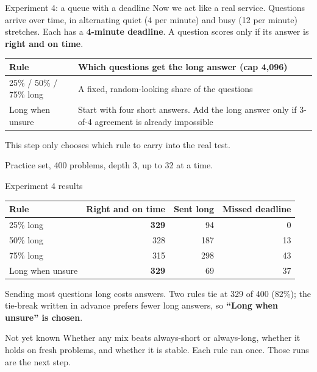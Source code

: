 \documentclass[aspectratio=169,11pt]{beamer}
\newcommand{\src}[1]{\par\vfill\begin{minipage}{0.96\textwidth}\color{muted}\tiny #1\end{minipage}\vspace{-0.15em}}
\newcommand{\takeaway}[1]{\par\vfill\begin{center}\colorbox{accent!8}{\parbox{0.9\textwidth}{\centering\small #1}}\end{center}\vspace{0.2em}}
\begin{document}
\begin{frame}{Experiment 4: a queue with a deadline}
  \small
  Now we act like a real service. Questions arrive over time, in alternating quiet (4 per minute)
  and busy (12 per minute) stretches. Each has a \textbf{4-minute deadline}.
  A question scores only if its answer is \textbf{right and on time}.
  \vspace{0.5em}
  \begin{center}
  \renewcommand{\arraystretch}{1.2}
  \begin{tabular}{@{}l p{8.4cm}@{}}
    \toprule
    \textbf{Rule} & \textbf{Which questions get the long answer (cap 4{,}096)} \\
    \midrule
    25\% / 50\% / 75\% long & A fixed, random-looking share of the questions \\
    Long when unsure & Start with four short answers. Add the long answer only if 3-of-4 agreement is already impossible \\
    \bottomrule
  \end{tabular}
  \end{center}
  \takeaway{This step only chooses which rule to carry into the real test.}
  \src{Practice set, 400 problems, depth 3, up to 32 at a time.}
\end{frame}

\begin{frame}{Experiment 4 results}
  \small
  \begin{center}
  \renewcommand{\arraystretch}{1.1}
  \begin{tabular}{@{}l r r r@{}}
    \toprule
    \textbf{Rule} & \textbf{Right and on time} & \textbf{Sent long} & \textbf{Missed deadline} \\
    \midrule
    25\% long & \textbf{329} & 94 & 0 \\
    50\% long & 328 & 187 & 13 \\
    75\% long & 315 & 298 & 43 \\
    Long when unsure & \textbf{329} & 69 & 37 \\
    \bottomrule
  \end{tabular}
  \end{center}
  \vspace{0.2em}
  Sending most questions long costs answers. Two rules tie at 329 of 400 (82\%);
  the tie-break written in advance prefers fewer long answers, so \textbf{``Long when unsure'' is chosen}.
  \vspace{0.4em}
  \begin{alertblock}{Not yet known}
    Whether any mix beats always-short or always-long, whether it holds on fresh problems,
    and whether it is stable. Each rule ran once. Those runs are the next step.
  \end{alertblock}
\end{frame}
\end{document}
